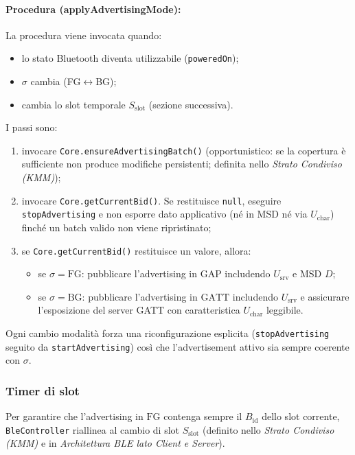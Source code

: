 \documentclass[a4paper,11pt,table,dvipsnames]{article}
\begin{document}
\paragraph{Procedura (applyAdvertisingMode):}
La procedura viene invocata quando:
\begin{itemize}[nosep]
    \item lo stato Bluetooth diventa utilizzabile (\texttt{poweredOn});
    \item \(\sigma\) cambia (FG\(\leftrightarrow\)BG);
    \item cambia lo slot temporale \(S_{\text{slot}}\) (sezione successiva).
\end{itemize}
I passi sono:
\begin{enumerate}
    \item invocare \texttt{Core.ensureAdvertisingBatch()} (opportunistico: se la copertura è sufficiente non produce modifiche persistenti; definita nello \emph{Strato Condiviso (KMM)});
    \item invocare \texttt{Core.getCurrentBid()}. Se restituisce \texttt{null}, eseguire \texttt{stopAdvertising} e non esporre dato applicativo (né in MSD né via \(U_{\text{char}}\)) finché un batch valido non viene ripristinato;
    \item se \texttt{Core.getCurrentBid()} restituisce un valore, allora:
          \begin{itemize}[nosep]
              \item se \(\sigma=\mathrm{FG}\): pubblicare l’advertising in \(\text{GAP}\) includendo \(U_{\text{srv}}\) e MSD \(D\);
              \item se \(\sigma=\mathrm{BG}\): pubblicare l’advertising in \(\text{GATT}\) includendo \(U_{\text{srv}}\) e assicurare l’esposizione del server GATT con caratteristica \(U_{\text{char}}\) leggibile.
          \end{itemize}
\end{enumerate}
Ogni cambio modalità forza una riconfigurazione esplicita (\texttt{stopAdvertising} seguito da \texttt{startAdvertising}) così che l’advertisement attivo sia sempre coerente con \(\sigma\).

\subsubsection{Timer di slot}
Per garantire che l’advertising in \(\mathrm{FG}\) contenga sempre il \(B_{\text{id}}\) dello slot corrente, \texttt{BleController} riallinea al cambio di slot \(S_{\text{slot}}\) (definito nello \emph{Strato Condiviso (KMM)} e in \emph{Architettura BLE lato Client e Server}).
\end{document}
